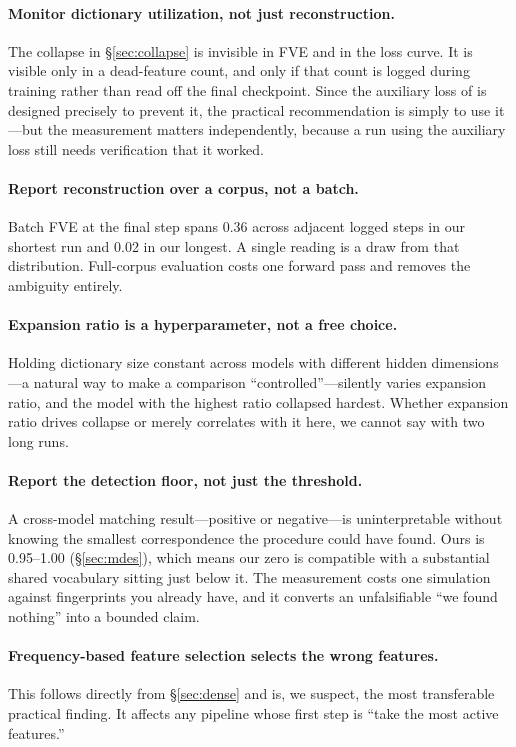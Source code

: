 \documentclass[11pt]{article}
\begin{document}
\paragraph{Monitor dictionary utilization, not just reconstruction.} The collapse in
\S\ref{sec:collapse} is invisible in FVE and in the loss curve. It is visible only in a
dead-feature count, and only if that count is logged during training rather than read
off the final checkpoint. Since the auxiliary loss of \citet{gao2024scaling} is designed
precisely to prevent it, the practical recommendation is simply to use it---but the
measurement matters independently, because a run using the auxiliary loss still needs
verification that it worked.

\paragraph{Report reconstruction over a corpus, not a batch.} Batch FVE at the final
step spans 0.36 across adjacent logged steps in our shortest run and 0.02 in our
longest. A single reading is a draw from that distribution. Full-corpus evaluation costs
one forward pass and removes the ambiguity entirely.

\paragraph{Expansion ratio is a hyperparameter, not a free choice.} Holding dictionary
size constant across models with different hidden dimensions---a natural way to make a
comparison ``controlled''---silently varies expansion ratio, and the model with the
highest ratio collapsed hardest. Whether expansion ratio drives collapse or merely
correlates with it here, we cannot say with two long runs.

\paragraph{Report the detection floor, not just the threshold.} A cross-model matching
result---positive or negative---is uninterpretable without knowing the smallest
correspondence the procedure could have found. Ours is 0.95--1.00 (\S\ref{sec:mdes}),
which means our zero is compatible with a substantial shared vocabulary sitting just
below it. The measurement costs one simulation against fingerprints you already have, and
it converts an unfalsifiable ``we found nothing'' into a bounded claim.

\paragraph{Frequency-based feature selection selects the wrong features.} This follows
directly from \S\ref{sec:dense} and is, we suspect, the most transferable practical
finding. It affects any pipeline whose first step is ``take the most active features.''
\end{document}
